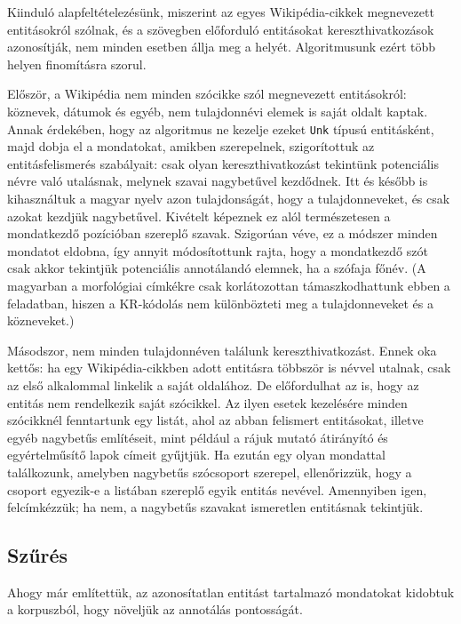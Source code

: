 \documentclass{llncs}
\begin{document}
Kiinduló alapfeltételezésünk, miszerint az egyes Wikipédia-cikkek megnevezett
entitásokról szólnak, és a szövegben előforduló entitásokat kereszthivatkozások
azonosítják, nem minden esetben állja meg a helyét. Algoritmusunk ezért
több helyen finomításra szorul.

Először, a Wikipédia nem minden szócikke szól megnevezett entitásokról: köznevek, dátumok és egyéb, nem tulajdonnévi elemek is
saját oldalt kaptak. Annak érdekében, hogy az algoritmus ne
kezelje ezeket \texttt{Unk} típusú entitásként, majd dobja el a mondatokat,
amikben szerepelnek, szigorítottuk az entitásfelismerés szabályait: csak olyan
kereszthivatkozást tekintünk potenciális névre való utalásnak, melynek szavai nagybetűvel kezdődnek.
Itt és később is kihasználtuk a magyar nyelv azon tulajdonságát, hogy a
tulajdonneveket, és csak azokat kezdjük nagybetűvel. 
Kivételt képeznek ez alól természetesen a mondatkezdő pozícióban szereplő szavak. Szigorúan véve, ez a módszer minden mondatot eldobna, így annyit módosítottunk rajta, hogy a mondatkezdő szót csak akkor tekintjük potenciális annotálandó elemnek, ha a szófaja főnév.  
(A magyarban a morfológiai címkékre csak korlátozottan támaszkodhattunk ebben a feladatban, hiszen a KR-kódolás nem különbözteti meg a tulajdonneveket és a közneveket.)

Másodszor, nem minden tulajdonnéven találunk
kereszthivatkozást. Ennek oka kettős: ha egy Wikipédia-cikkben adott entitásra
többször is névvel utalnak, csak az első alkalommal linkelik a saját oldalához. De
előfordulhat az is, hogy az entitás nem rendelkezik saját szócikkel. Az ilyen
esetek kezelésére minden szócikknél fenntartunk egy listát, ahol az abban
felismert entitásokat, illetve egyéb nagybetűs említéseit, mint például a rájuk mutató
átirányító és egyértelműsítő lapok címeit gyűjtjük. Ha ezután egy olyan mondattal
találkozunk, amelyben nagybetűs szócsoport szerepel, ellenőrizzük, hogy a csoport
egyezik-e a listában szereplő egyik entitás nevével. Amennyiben igen,
felcímkézzük; ha nem, a nagybetűs szavakat ismeretlen entitásnak tekintjük.

\subsection{Szűrés}

Ahogy már említettük, az azonosítatlan entitást tartalmazó mondatokat kidobtuk a korpuszból, hogy növeljük az annotálás pontosságát. 
\end{document}
